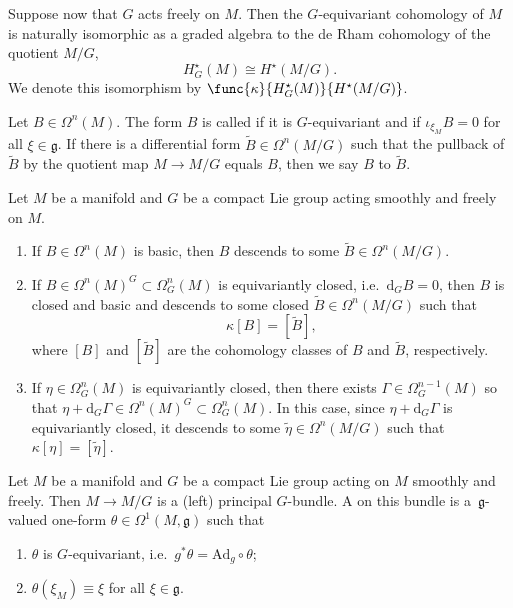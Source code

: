 Suppose now that $G$ acts freely on $M$.  Then the $G$-equivariant cohomology of $M$ is naturally isomorphic as a graded algebra to the de Rham cohomology of the quotient $M/G$,
\[
  H_G^{\star}(M) \cong H^{\star} (M/G).
\]
We denote this isomorphism by $\func{\kappa}{H_G^{\star}(M)}{H^{\star}(M/G)}$.

Let $B \in \Omega^n(M)$.  The form $B$ is called  if it is $G$-equivariant and if $\iota_{\xi_M} B = 0$ for all $\xi \in \mathfrak{g}$.  If there is a dif\/ferential form $\widetilde{B} \in \Omega^n(M/G)$ such that the pullback of $\widetilde{B}$ by the quotient map $M \to M/G$ equals $B$, then we say $B$  to $\widetilde{B}$.


\begin{Proposition}
Let $M$ be a manifold and $G$ be a compact Lie group acting smoothly and freely on $M$.
\begin{enumerate} \itemsep=0pt\litlet
  \item If $B \in \Omega^n(M)$ is basic, then $B$ descends to some $\widetilde{B} \in \Omega^n(M/G)$.
  \item If $B \in \Omega^n(M)^G \subset \Omega_G^n(M)$ is equivariantly closed, i.e.\ $\mathrm{d}_G B = 0$, then $B$ is closed and basic and descends to some closed $\widetilde{B} \in \Omega^n(M/G)$ such that
    \[
      \kappa[B] = [\widetilde{B}],
    \]
  where $[B]$ and $[\widetilde{B}]$ are the cohomology classes of $B$ and $\widetilde{B}$, respectively.
  \item If $\eta \in \Omega_G^n(M)$ is equivariantly closed, then there exists $\Gamma \in \Omega_G^{n-1}(M)$ so that $\eta + \mathrm{d}_G \Gamma \in \Omega^n(M)^G \subset \Omega_G^n(M)$.  In this case, since $\eta + \mathrm{d}_G \Gamma$ is equivariantly closed, it descends to some $\widetilde{\eta} \in \Omega^n(M/G)$ such that $\kappa[\eta] = [\widetilde{\eta}]$.
\end{enumerate}
\end{Proposition}


\begin{Definition} \label{def3}
Let $M$ be a manifold and $G$ be a compact Lie group acting on $M$ smoothly and freely.  Then $M \to M/G$ is a (left) principal $G$-bundle.  A  on this bundle is a~$\mathfrak{g}$-valued one-form $\theta \in \Omega^1(M,\mathfrak{g})$ such that
\begin{enumerate}\itemsep=0pt
  \item $\theta$ is $G$-equivariant, i.e.\ $g^* \theta = \mathrm{Ad}_g \circ \theta$;
  \item $\theta (\xi_M) \equiv \xi$ for all $\xi \in \mathfrak{g}$.
\end{enumerate}
\end{Definition}



